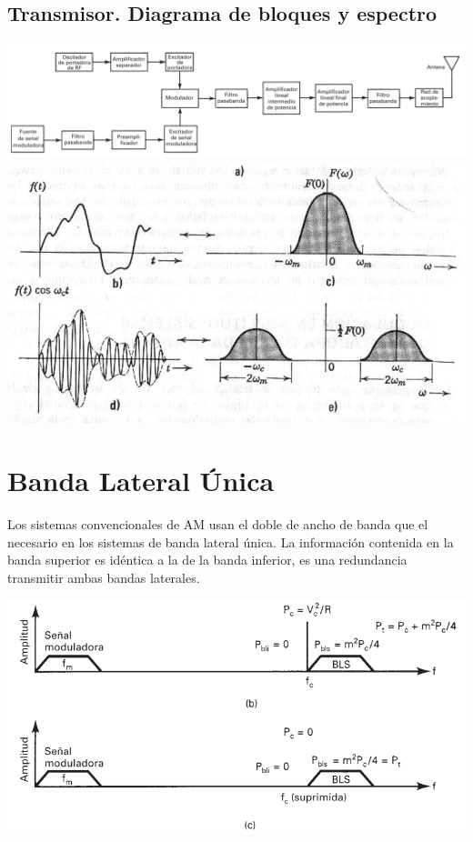 \documentclass[10pt,a4paper]{article}
\begin{document}
\subsection{Transmisor. Diagrama de bloques y espectro}
\begin{center}
	\includegraphics[scale=0.5]{screenshot004}
	\includegraphics[scale=0.5]{screenshot005}
\end{center}

\section{Banda Lateral Única}
Los sistemas convencionales de AM usan el doble de ancho de banda que el necesario en los sistemas de banda lateral única. La información contenida en la banda superior es idéntica a la de la banda inferior, es una redundancia transmitir ambas bandas laterales.

\begin{center}
	\includegraphics[scale=0.5]{screenshot006}
\end{center}
\end{document}
